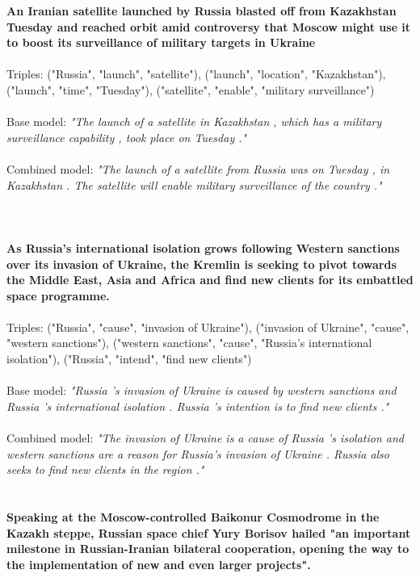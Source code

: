 \documentclass[
hf, %
]{ceurart}
\begin{document}
\textbf{An Iranian satellite launched by Russia blasted off from Kazakhstan Tuesday and reached orbit amid controversy that Moscow might use it to boost its surveillance of military targets in Ukraine}\\\\
\noindent
Triples: ("Russia", "launch", "satellite"), ("launch", "location", "Kazakhstan"), ("launch", "time", "Tuesday"), ("satellite", "enable", "military surveillance")\\\\
\noindent
Base model: \textit{"The launch of a satellite in Kazakhstan , which has a military surveillance capability , took place on Tuesday ."}\\\\
\noindent
Combined model: \textit{"The launch of a satellite from Russia was on Tuesday , in Kazakhstan . The satellite will enable military surveillance of the country ."}\\\\\\\\
\noindent
\textbf{As Russia's international isolation grows following Western sanctions over its invasion of Ukraine, the Kremlin is seeking to pivot towards the Middle East, Asia and Africa and find new clients for its embattled space programme.}\\\\
\noindent
Triples: ("Russia", "cause", "invasion of Ukraine"), ("invasion of Ukraine", "cause", "western sanctions"), ("western sanctions", "cause", "Russia's international isolation"), ("Russia", "intend", "find new clients")\\\\
\noindent
Base model: \textit{"Russia 's invasion of Ukraine is caused by western sanctions and Russia 's international isolation . Russia 's intention is to find new clients ."}\\\\
\noindent
Combined model: \textit{"The invasion of Ukraine is a cause of Russia 's isolation and western sanctions are a reason for Russia's invasion of Ukraine . Russia also seeks to find new clients in the region ."}\\\\\\
\noindent
\textbf{Speaking at the Moscow-controlled Baikonur Cosmodrome in the Kazakh steppe, Russian space chief Yury Borisov hailed "an important milestone in Russian-Iranian bilateral cooperation, opening the way to the implementation of new and even larger projects".}\\\\
\end{document}
